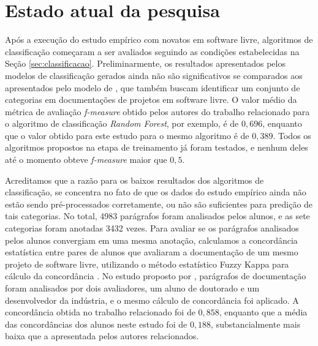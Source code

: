 \chapter{Estado atual da pesquisa}
\label{cap:resultados-preliminares}
Após a execução do estudo empírico com novatos em software livre, algoritmos de classificação começaram a ser avaliados seguindo as condições estabelecidas na Seção \ref{sec:classificacao}. Preliminarmente, os resultados apresentados pelos modelos de classificação gerados ainda não são significativos se comparados aos apresentados pelo modelo de \citet{prana2019categorizing}, que também buscam identificar um conjunto de categorias em documentações de projetos em software livre. O valor médio da métrica de avaliação \textit{f-measure} obtido pelos autores do trabalho relacionado para o algoritmo de classificação \textit{Random Forest}, por exemplo, é de $0,696$, enquanto que o valor obtido para este estudo para o mesmo algoritmo é de $0,389$. Todos os algoritmos propostos na etapa de treinamento já foram testados, e nenhum deles até o momento obteve \textit{f-measure} maior que $0,5$.

Acreditamos que a razão para os baixos resultados dos algoritmos de classificação, se concentra no fato de que os dados do estudo empírico ainda não estão sendo pré-processados corretamente, ou não são suficientes para predição de tais categorias. No total, 4983 parágrafos foram analisados pelos alunos, e as sete categorias foram anotadas 3432 vezes. Para avaliar se os parágrafos analisados pelos alunos convergiam em uma mesma anotação, calculamos a concordância estatística entre pares de alunos que avaliaram a documentação de um mesmo projeto de software livre, utilizando o método estatístico Fuzzy Kappa para cálculo da concordância \citep{kirilenko2016fuzzy}. No estudo proposto por \citet{prana2019categorizing}, parágrafos de documentação foram analisados por dois avaliadores, um aluno de doutorado e um desenvolvedor da indústria, e o mesmo cálculo de concordância foi aplicado. A concordância obtida no trabalho relacionado foi de $0,858$, enquanto que a média das concordâncias dos alunos neste estudo foi de $0,188$, substancialmente mais baixa que a apresentada pelos autores relacionados. 

